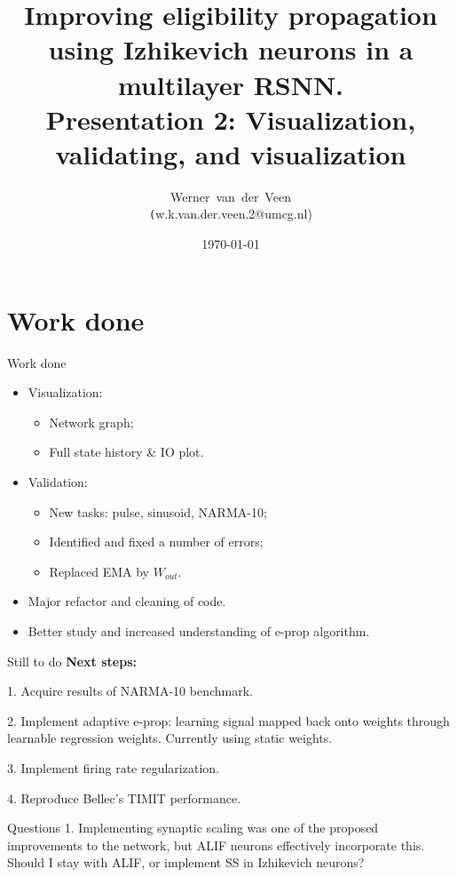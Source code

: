 \documentclass[t]{beamer}
\title[Eligibility propagation]{Improving eligibility propagation using Izhikevich neurons in a multilayer RSNN.\\\vspace{10pt}
\large{Presentation 2: Visualization, validating, and visualization}}
\author[Werner]{Werner~van~der~Veen\\\tiny\texttt({w.k.van.der.veen.2@umcg.nl})}\date{\today}
\begin{document}
\begin{frame}
    \titlepage
\end{frame}


\small
\section{Work done}

\begin{frame}{Work done}
	\begin{itemize}
		\item Visualization:
			\begin{itemize}
				\item Network graph;
				\item Full state history \& IO plot.
			\end{itemize}
		\item Validation:
			\begin{itemize}
				\item New tasks: pulse, sinusoid, NARMA-10;
				\item Identified and fixed a number of errors;
				\item Replaced EMA by $W_{out}$.
				
			\end{itemize}
		\item Major refactor and cleaning of code.
		\item Better study and increased understanding of e-prop algorithm.
	\end{itemize}
\end{frame}

\begin{frame}{Still to do}
    \textbf{Next steps:}
    
    1. Acquire results of NARMA-10 benchmark.
    
    2. Implement adaptive e-prop: learning signal mapped back onto weights through learnable regression weights. Currently using static weights.
    
    3. Implement firing rate regularization.
    
    4. Reproduce Bellec's TIMIT performance.
\end{frame}

\begin{frame}{Questions}
    1. Implementing synaptic scaling was one of the proposed improvements to the network, but ALIF neurons effectively incorporate this. Should I stay with ALIF, or implement SS in Izhikevich neurons?
\end{frame}
\end{document}
